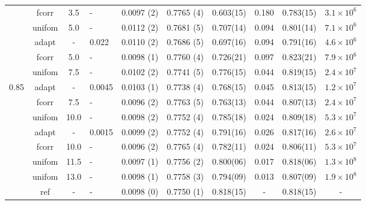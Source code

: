\documentclass[aps,pre,preprint]{revtex4}
\begin{document}
\begin{table}
\begin{tabular*}{0.99\textwidth}{c|c|@{\extracolsep{\fill}}clcccccc}
    & \textrm{fcorr}  & 3.5     & -       & 0.0097 (2) & 0.7765 (4) & 0.603(15) & 0.180 & 0.783(15) & $3.1\times 10^6$\\\cline{2-10}
    & \textrm{unifom} & 5.0     & -       & 0.0112 (2) & 0.7681 (5) & 0.707(14) & 0.094 & 0.801(14) & $7.1\times 10^6$\\
    & \textrm{adapt}  & -       & 0.022   & 0.0110 (2) & 0.7686 (5) & 0.697(16) & 0.094 & 0.791(16) & $4.6\times 10^6$\\
    & \textrm{fcorr}  & 5.0     & -       & 0.0098 (1) & 0.7760 (4) & 0.726(21) & 0.097 & 0.823(21) & $7.9\times 10^6$\\\cline{2-10}
    & \textrm{unifom} & 7.5     & -       & 0.0102 (2) & 0.7741 (5) & 0.776(15) & 0.044 & 0.819(15) & $2.4\times 10^7$\\
0.85& \textrm{adapt}  & -       & 0.0045  & 0.0103 (1) & 0.7738 (4) & 0.768(15) & 0.045 & 0.813(15) & $1.2\times 10^7$\\
    & \textrm{fcorr}  & 7.5     & -       & 0.0096 (2) & 0.7763 (5) & 0.763(13) & 0.044 & 0.807(13) & $2.4\times 10^7$\\\cline{2-10}
    & \textrm{unifom} & 10.0    & -       & 0.0098 (2) & 0.7752 (4) & 0.785(18) & 0.024 & 0.809(18) & $5.3\times 10^7$\\
    & \textrm{adapt}  & -       & 0.0015  & 0.0099 (2) & 0.7752 (4) & 0.791(16) & 0.026 & 0.817(16) & $2.6\times 10^7$\\
    & \textrm{fcorr}  & 10.0    & -       & 0.0096 (2) & 0.7765 (4) & 0.782(11) & 0.024 & 0.806(11) & $5.3\times 10^7$\\\cline{2-10}
    & \textrm{unifom} & 11.5    & -       & 0.0097 (1) & 0.7756 (2) & 0.800(06) & 0.017 & 0.818(06) & $1.3\times 10^8$\\
    & \textrm{unifom} & 13.0    & -       & 0.0098 (1) & 0.7758 (3) & 0.794(09) & 0.013 & 0.807(09) & $1.9\times 10^8$\\\cline{2-10}
    & \textrm{ref}    & -       & -       & 0.0098 (0) & 0.7750 (1) & 0.818(15) & -     & 0.818(15) & - \\    \hline\hline
  \end{tabular*}
\end{table}
\end{document}
